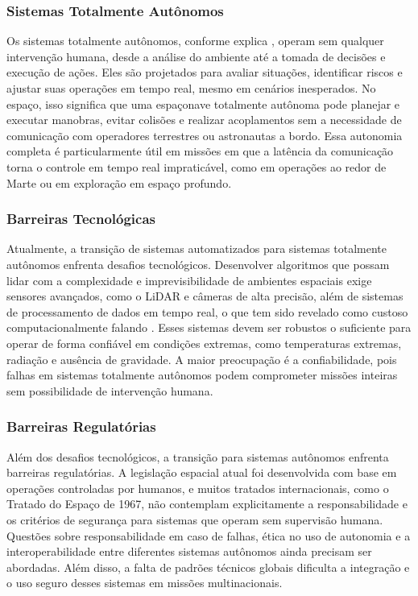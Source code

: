 \subsubsection{Sistemas Totalmente Autônomos}

Os sistemas totalmente autônomos, conforme explica \cite{ibmAutomation}, operam sem qualquer intervenção humana, desde a análise do ambiente até a tomada de decisões e execução de ações. Eles são projetados para avaliar situações, identificar riscos e ajustar suas operações em tempo real, mesmo em cenários inesperados. No espaço, isso significa que uma espaçonave totalmente autônoma pode planejar e executar manobras, evitar colisões e realizar acoplamentos sem a necessidade de comunicação com operadores terrestres ou astronautas a bordo. Essa autonomia completa é particularmente útil em missões em que a latência da comunicação torna o controle em tempo real impraticável, como em operações ao redor de Marte ou em exploração em espaço profundo.

\subsubsection{Barreiras Tecnológicas}

Atualmente, a transição de sistemas automatizados para sistemas totalmente autônomos enfrenta desafios tecnológicos. Desenvolver algoritmos que possam lidar com a complexidade e imprevisibilidade de ambientes espaciais exige sensores avançados, como o LiDAR e câmeras de alta precisão, além de sistemas de processamento de dados em tempo real, o que tem sido revelado como custoso computacionalmente falando \cite{ainowComputeAI}. Esses sistemas devem ser robustos o suficiente para operar de forma confiável em condições extremas, como temperaturas extremas, radiação e ausência de gravidade. A maior preocupação é a confiabilidade, pois falhas em sistemas totalmente autônomos podem comprometer missões inteiras sem possibilidade de intervenção humana.

\subsubsection{Barreiras Regulatórias}

Além dos desafios tecnológicos, a transição para sistemas autônomos enfrenta barreiras regulatórias. A legislação espacial atual foi desenvolvida com base em operações controladas por humanos, e muitos tratados internacionais, como o Tratado do Espaço de 1967, não contemplam explicitamente a responsabilidade e os critérios de segurança para sistemas que operam sem supervisão humana. Questões sobre responsabilidade em caso de falhas, ética no uso de autonomia \cite{ainowComputeAI} e a interoperabilidade entre diferentes sistemas autônomos ainda precisam ser abordadas. Além disso, a falta de padrões técnicos globais dificulta a integração e o uso seguro desses sistemas em missões multinacionais.


